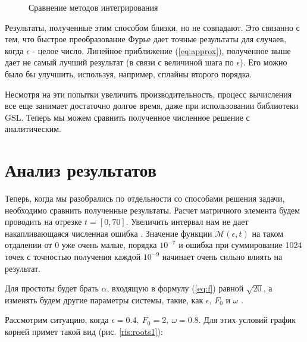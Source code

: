 \documentclass[14pt]{article}
\numberwithin{figure}{section}
\numberwithin{equation}{section}
\newcommand{\sectionbreak}{\clearpage}
\newcommand{\cM}{\mathcal{M}}
\begin{document}
\begin{figure}[h]
	\caption{Сравнение методов интегрирования}
	\label{ris:fftw_compare_no_fftw2}
\end{figure}

Результаты, полученные этим способом близки, но не совпадают. Это связанно с тем, что быстрое преобразование Фурье дает точные результаты для случаев, когда $\epsilon$ - целое число. Линейное приближение (\ref{eq:approx}), полученное выше дает не самый лучший результат (в связи с величиной шага по $\epsilon$). Его можно было бы улучшить, используя, например, сплайны второго порядка.

Несмотря на эти попытки увеличить производительность, процесс вычисления все еще занимает достаточно долгое время, даже при использовании библиотеки GSL.
Теперь мы можем сравнить полученное численное решение с аналитическим.

\sectionbreak
\section{Анализ результатов}
Теперь, когда мы разобрались по отдельности со способами решения задачи, необходимо сравнить полученные результаты.
Расчет матричного элемента будем проводить на отрезке $t = [0, 70]$. Увеличить интервал нам не дает накапливающаяся численная ошибка . Значение функции $\cM(\epsilon, t)$ на таком отдалении от 0 уже очень малые, порядка $10^{-7}$ и ошибка при суммирование 1024 точек с точностью получения каждой $10^{-9}$ начинает очень сильно влиять на результат.

Для простоты будет брать $\alpha$, входящую в формулу (\ref{eq:f}) равной $\sqrt{20}$, а изменять будем другие параметры системы, такие, как $\epsilon$, $F_0$ и $\omega$ .

Рассмотрим ситуацию, когда $\epsilon = 0.4,\ F_0 = 2,\ \omega = 0.8$. Для этих условий график корней примет такой вид (рис. \ref{ris:roots1}):
\end{document}
